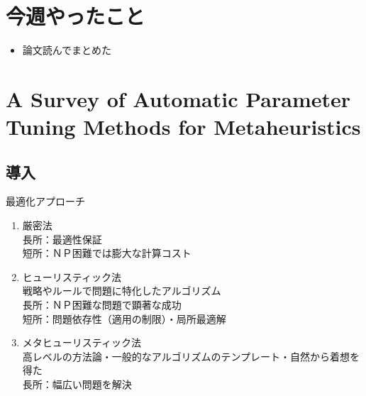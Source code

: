 \documentclass[twocolumn]{jarticle}     %
\begin{document}


\section{今週やったこと}
\begin{itemize}
	\item {論文読んでまとめた}
\end{itemize}



\section{A Survey of Automatic Parameter Tuning Methods for Metaheuristics}
%

\subsection{導入}

最適化アプローチ
\begin{enumerate}
  \item 厳密法 \\
  長所：最適性保証\\
  短所：ＮＰ困難では膨大な計算コスト

  \item ヒューリスティック法 \\
  戦略やルールで問題に特化したアルゴリズム\\
  長所：ＮＰ困難な問題で顕著な成功\\
  短所：問題依存性（適用の制限）・局所最適解

  \item メタヒューリスティック法 \\
  高レベルの方法論・一般的なアルゴリズムのテンプレート・自然から着想を得た\\
  長所：幅広い問題を解決
\end{enumerate}
\end{document}
